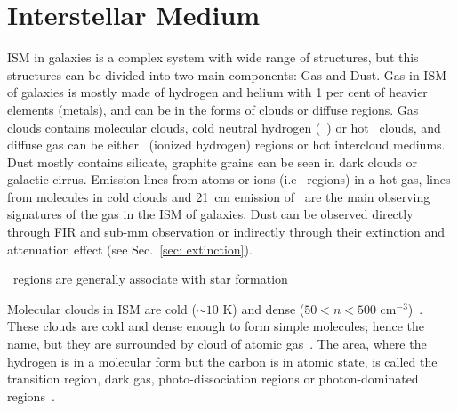 \section{Interstellar Medium}
\label{sec: ism_intro}
ISM in galaxies is a complex system with wide range of structures, but this structures can be divided into two main components: Gas and Dust.
Gas in ISM of galaxies is mostly made of hydrogen and helium with 1 per cent of heavier elements (metals), and can be in the forms of clouds or diffuse regions.
Gas clouds contains molecular clouds, cold neutral hydrogen (\hi~) or hot \hi~clouds, and diffuse gas can be either \hii~(ionized hydrogen) regions or hot intercloud mediums.
Dust mostly contains silicate, graphite grains can be seen in dark clouds or galactic cirrus.
Emission lines from atoms or ions (i.e \hii~regions) in a hot gas, lines from molecules in cold clouds and 21~cm emission of \hi~are the main observing signatures of the gas in the ISM of galaxies.
Dust can be observed directly through FIR and sub-mm observation or indirectly through their extinction and attenuation effect (see Sec.~\ref{sec: extinction}).







\hii~regions are generally associate with star formation 

Molecular clouds in ISM are cold ($\sim10$ K) and dense ($ 50<n<500$ cm$^{-3}$)~\cite{Bolato08}.
These clouds are cold and dense enough to form simple molecules; hence the name, but they are surrounded by cloud of atomic gas~\cite{Kennicutt12}.
The area, where the hydrogen is in a molecular form but the carbon is in atomic state, is called the transition region, dark gas, photo-dissociation regions or photon-dominated regions~\citep[e.g.][]{van88,Hollenbach99}.

